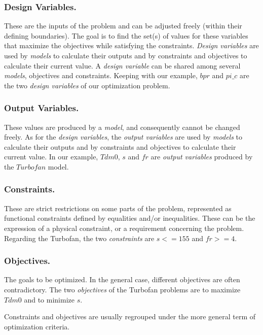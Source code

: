 \subsubsection*{Design Variables.}

These are the inputs of the problem and can be adjusted freely (within their defining boundaries). The goal is to find the set(s) of values for these variables that maximize the objectives while satisfying the constraints.
\emph{Design variables} are used by \emph{models} to calculate their outputs and by constraints and objectives to calculate their current value. A \emph{design variable} can be shared among several \emph{models}, objectives and constraints.
Keeping with our example, $bpr$ and $pi\_c$ are the two \emph{design variables} of our optimization problem.

\subsubsection*{Output Variables.}

These values are produced by a \emph{model}, and consequently cannot be changed freely.
As for the \emph{design variables}, the \emph{output variables} are used by \emph{models} to calculate their outputs and by constraints and objectives to calculate their current value.
In our example, $Tdm0$, $s$ and $fr$ are \emph{output variables} produced by the $Turbofan$ model.

\subsubsection*{Constraints.}

These are strict restrictions on some parts of the problem, represented as functional constraints defined by equalities and/or inequalities. These can be the expression of a physical constraint, or a requirement concerning the problem.
Regarding the Turbofan, the two \emph{constraints} are $s <= 155$ and $fr >=4$.

\subsubsection*{Objectives.}

The goals to be optimized. In the general case, different objectives are often contradictory.
The two \emph{objectives} of the Turbofan problems are to maximize $Tdm0$ and to minimize $s$.

Constraints and objectives are usually regrouped under the more general term of optimization criteria. 

